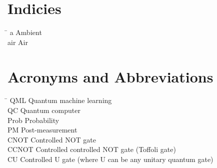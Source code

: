\section*{Indicies}
\begin{tabbing}
 \hspace*{1.6cm}  \= \kill
 a \> Ambient \\[0.5ex]
 air \> Air
\end{tabbing}

\section*{Acronyms and Abbreviations}
\begin{tabbing}
 \hspace*{1.6cm}  \= \kill
 QML \> Quantum machine learning \\[0.5ex]
 QC \> Quantum computer \\[0.5ex]
 Prob \> Probability \\[0.5ex]
 PM \> Post-measurement \\[0.5ex]
 CNOT \> Controlled NOT gate \\[0.5ex]
 CCNOT \> Controlled controlled NOT gate (Toffoli gate) \\[0.5ex]
 CU \> Controlled U gate (where U can be any unitary quantum gate) \\[0.5ex]
\end{tabbing}

 \cleardoublepage

